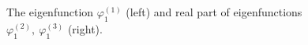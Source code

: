 \documentclass[authoryear]{elsarticle}
\begin{document}
\begin{figure}[!h]
  \begin{center}
\begin{minipage}{0.49\linewidth}
 \\
\end{minipage}
\hfill
\begin{minipage}{0.49\linewidth}
 \\
\end{minipage}
\caption{The eigenfunction $\varphi^{(1)}_1$ (left) and real part of eigenfunctions $\varphi^{(2)}_1, \ \varphi^{(3)}_1$  (right).}
\label{fig:4}
  \end{center}
\end{figure}
\end{document}
